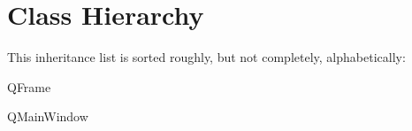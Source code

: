 \section{Class Hierarchy}
This inheritance list is sorted roughly, but not completely, alphabetically\+:\begin{DoxyCompactList}
\item {}
\item Q\+Frame\begin{DoxyCompactList}
\item {}
\end{DoxyCompactList}
\item Q\+Main\+Window\begin{DoxyCompactList}
\item {}
\end{DoxyCompactList}
\end{DoxyCompactList}
